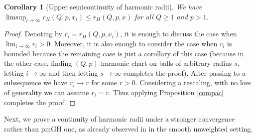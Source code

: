 \documentclass[11pt,reqno]{amsart}
\newtheorem{corollary}[theorem]{Corollary}
\theoremstyle{definition}
\numberwithin{equation}{section}
\begin{document}
\begin{corollary}[Upper semicontinuity of harmonic radii]\label{cor:upsem}
We have
$
\limsup_{i \to \infty}r_H(Q, p, x_i) \le r_H(Q, p, x)
$
for all $Q \ge 1$ and $p>1$.
\end{corollary}
\begin{proof}
Denoting by $r_i=r_H(Q, p, x_i)$, it is enough to discuss the case when $\lim_{i \to \infty}r_i>0$. 
Moreover, it is also enough to consider the case when $r_i$ is bounded because the remaining case is just a corollary of this case (because in the other case, finding $(Q, p)$-harmonic chart on balls of arbitrary radius $s$, letting $i \to \infty$ and then letting $s \to \infty$ completes the proof). 
After passing to a subsequence we have $r_i \to r$ for some $r > 0$.
Considering a rescaling, with no loss of generality we can assume $r_i=r$. Thus applying Proposition \ref{compac} completes the proof.
\end{proof}
Next, we prove a continuity of harmonic radii under a stronger convergence rather than pmGH one, as already observed in \cite{AC} in the smooth unweighted setting. 
\end{document}
